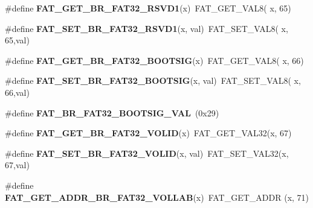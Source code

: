 \begin{DoxyCompactItemize}
\item 
\mbox{\label{group__libfs__dosfs_ga9be3391f5f70431423c124ffc66ed921}} 
\#define {\bfseries F\+A\+T\+\_\+\+G\+E\+T\+\_\+\+B\+R\+\_\+\+F\+A\+T32\+\_\+\+R\+S\+V\+D1}(x)~F\+A\+T\+\_\+\+G\+E\+T\+\_\+\+V\+A\+L8( x, 65)
\item 
\mbox{\label{group__libfs__dosfs_gaa5bdf4b8ebbbff77c0890e86092e4200}} 
\#define {\bfseries F\+A\+T\+\_\+\+S\+E\+T\+\_\+\+B\+R\+\_\+\+F\+A\+T32\+\_\+\+R\+S\+V\+D1}(x,  val)~F\+A\+T\+\_\+\+S\+E\+T\+\_\+\+V\+A\+L8( x, 65,val)
\item 
\mbox{\label{group__libfs__dosfs_gad2a94c64543168f8643e4396868a5018}} 
\#define {\bfseries F\+A\+T\+\_\+\+G\+E\+T\+\_\+\+B\+R\+\_\+\+F\+A\+T32\+\_\+\+B\+O\+O\+T\+S\+IG}(x)~F\+A\+T\+\_\+\+G\+E\+T\+\_\+\+V\+A\+L8( x, 66)
\item 
\mbox{\label{group__libfs__dosfs_ga181c21c01c347330271ee63e05942fe1}} 
\#define {\bfseries F\+A\+T\+\_\+\+S\+E\+T\+\_\+\+B\+R\+\_\+\+F\+A\+T32\+\_\+\+B\+O\+O\+T\+S\+IG}(x,  val)~F\+A\+T\+\_\+\+S\+E\+T\+\_\+\+V\+A\+L8( x, 66,val)
\item 
\mbox{\label{group__libfs__dosfs_ga4fc6b6542efc6f4b3e93022b228e6687}} 
\#define {\bfseries F\+A\+T\+\_\+\+B\+R\+\_\+\+F\+A\+T32\+\_\+\+B\+O\+O\+T\+S\+I\+G\+\_\+\+V\+AL}~(0x29)
\item 
\mbox{\label{group__libfs__dosfs_ga5fcb70b68856b9cd711440026602e96e}} 
\#define {\bfseries F\+A\+T\+\_\+\+G\+E\+T\+\_\+\+B\+R\+\_\+\+F\+A\+T32\+\_\+\+V\+O\+L\+ID}(x)~F\+A\+T\+\_\+\+G\+E\+T\+\_\+\+V\+A\+L32(x, 67)
\item 
\mbox{\label{group__libfs__dosfs_ga221804c2383be0248455908cfccbab61}} 
\#define {\bfseries F\+A\+T\+\_\+\+S\+E\+T\+\_\+\+B\+R\+\_\+\+F\+A\+T32\+\_\+\+V\+O\+L\+ID}(x,  val)~F\+A\+T\+\_\+\+S\+E\+T\+\_\+\+V\+A\+L32(x, 67,val)
\item 
\mbox{\label{group__libfs__dosfs_ga921f769ddd5b2f6864864ed4e527952b}} 
\#define {\bfseries F\+A\+T\+\_\+\+G\+E\+T\+\_\+\+A\+D\+D\+R\+\_\+\+B\+R\+\_\+\+F\+A\+T32\+\_\+\+V\+O\+L\+L\+AB}(x)~F\+A\+T\+\_\+\+G\+E\+T\+\_\+\+A\+D\+DR (x, 71)

\end{DoxyCompactItemize}
